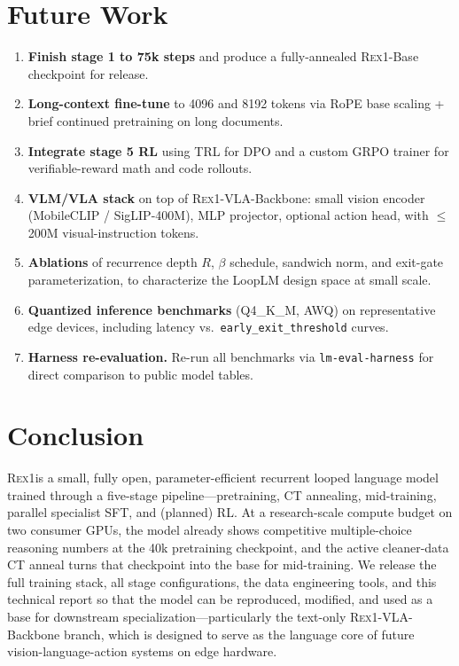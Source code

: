 \documentclass[11pt,a4paper]{article}
\newcommand{\REX}{\textsc{Rex1}\xspace}
\providecommand{\xspace}{}
\begin{document}
\section{Future Work}

\begin{enumerate}[leftmargin=*]
  \item \textbf{Finish stage 1 to 75k steps} and produce a fully-annealed
    \REX-Base checkpoint for release.
  \item \textbf{Long-context fine-tune} to 4096 and 8192 tokens via RoPE
    base scaling + brief continued pretraining on long documents.
  \item \textbf{Integrate stage 5 RL} using TRL for DPO and a custom GRPO
    trainer for verifiable-reward math and code rollouts.
  \item \textbf{VLM/VLA stack} on top of \REX-VLA-Backbone: small vision
    encoder (MobileCLIP / SigLIP-400M), MLP projector, optional action head,
    with $\le$200M visual-instruction tokens.
  \item \textbf{Ablations} of recurrence depth $R$, $\beta$ schedule, sandwich
    norm, and exit-gate parameterization, to characterize the LoopLM design
    space at small scale.
  \item \textbf{Quantized inference benchmarks} (Q4\_K\_M, AWQ) on
    representative edge devices, including latency vs.\
    \texttt{early\_exit\_threshold} curves.
  \item \textbf{Harness re-evaluation.} Re-run all benchmarks via
    \texttt{lm-eval-harness} for direct comparison to public model tables.
\end{enumerate}

\section{Conclusion}

\REX is a small, fully open, parameter-efficient recurrent looped language
model trained through a five-stage pipeline---pretraining, CT annealing,
mid-training, parallel specialist SFT, and (planned) RL. At a research-scale
compute budget on two consumer GPUs, the model already shows competitive
multiple-choice reasoning numbers at the 40k pretraining checkpoint, and the
active cleaner-data CT anneal turns that checkpoint into the base for
mid-training. We release the full training stack,
all stage configurations, the data engineering tools, and this technical
report so that the model can be reproduced, modified, and used as a base
for downstream specialization---particularly the text-only
\REX-VLA-Backbone branch, which is designed to serve as the language core
of future vision-language-action systems on edge hardware.
\end{document}
